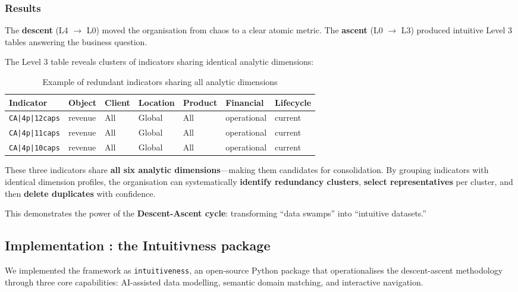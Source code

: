 \documentclass[12pt,a4paper]{article}
\begin{document}
\subsubsection{Results}

The \textbf{descent} (L4 $\to$ L0) moved the organisation from chaos to a clear atomic metric. The \textbf{ascent} (L0 $\to$ L3) produced intuitive Level 3 tables answering the business question.

The Level 3 table reveals clusters of indicators sharing identical analytic dimensions:

\begin{table}[h]
\centering
\small
\begin{tabular}{@{}lllllll@{}}
\toprule
\textbf{Indicator} & \textbf{Object} & \textbf{Client} & \textbf{Location} & \textbf{Product} & \textbf{Financial} & \textbf{Lifecycle} \\ \midrule
\texttt{CA|4p|12caps} & revenue & All & Global & All & operational & current \\
\texttt{CA|4p|11caps} & revenue & All & Global & All & operational & current \\
\texttt{CA|4p|10caps} & revenue & All & Global & All & operational & current \\ \bottomrule
\end{tabular}
\caption{Example of redundant indicators sharing all analytic dimensions}
\end{table}

These three indicators share \textbf{all six analytic dimensions}---making them candidates for consolidation. By grouping indicators with identical dimension profiles, the organisation can systematically \textbf{identify redundancy clusters}, \textbf{select representatives} per cluster, and then \textbf{delete duplicates} with confidence.

This demonstrates the power of the \textbf{Descent-Ascent cycle}: transforming ``data swamps'' into ``intuitive datasets.''

\subsection{Implementation : the Intuitivness package}


We implemented the framework as \texttt{intuitiveness}, an open-source Python package that operationalises the descent-ascent methodology through three core capabilities: AI-assisted data modelling, semantic domain matching, and interactive navigation.
\end{document}

